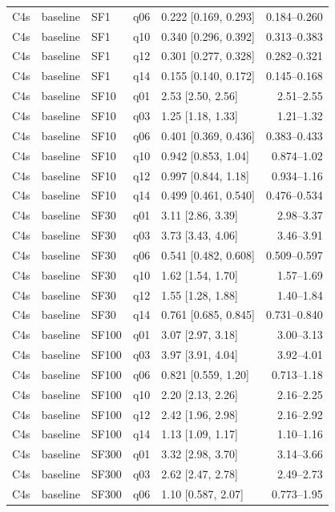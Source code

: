 \begin{longtable}{lllllr}
C4s & baseline & SF1 & q06 & 0.222 [0.169, 0.293] & 0.184--0.260 \\
C4s & baseline & SF1 & q10 & 0.340 [0.296, 0.392] & 0.313--0.383 \\
C4s & baseline & SF1 & q12 & 0.301 [0.277, 0.328] & 0.282--0.321 \\
C4s & baseline & SF1 & q14 & 0.155 [0.140, 0.172] & 0.145--0.168 \\
C4s & baseline & SF10 & q01 & 2.53 [2.50, 2.56] & 2.51--2.55 \\
C4s & baseline & SF10 & q03 & 1.25 [1.18, 1.33] & 1.21--1.32 \\
C4s & baseline & SF10 & q06 & 0.401 [0.369, 0.436] & 0.383--0.433 \\
C4s & baseline & SF10 & q10 & 0.942 [0.853, 1.04] & 0.874--1.02 \\
C4s & baseline & SF10 & q12 & 0.997 [0.844, 1.18] & 0.934--1.16 \\
C4s & baseline & SF10 & q14 & 0.499 [0.461, 0.540] & 0.476--0.534 \\
C4s & baseline & SF30 & q01 & 3.11 [2.86, 3.39] & 2.98--3.37 \\
C4s & baseline & SF30 & q03 & 3.73 [3.43, 4.06] & 3.46--3.91 \\
C4s & baseline & SF30 & q06 & 0.541 [0.482, 0.608] & 0.509--0.597 \\
C4s & baseline & SF30 & q10 & 1.62 [1.54, 1.70] & 1.57--1.69 \\
C4s & baseline & SF30 & q12 & 1.55 [1.28, 1.88] & 1.40--1.84 \\
C4s & baseline & SF30 & q14 & 0.761 [0.685, 0.845] & 0.731--0.840 \\
C4s & baseline & SF100 & q01 & 3.07 [2.97, 3.18] & 3.00--3.13 \\
C4s & baseline & SF100 & q03 & 3.97 [3.91, 4.04] & 3.92--4.01 \\
C4s & baseline & SF100 & q06 & 0.821 [0.559, 1.20] & 0.713--1.18 \\
C4s & baseline & SF100 & q10 & 2.20 [2.13, 2.26] & 2.16--2.25 \\
C4s & baseline & SF100 & q12 & 2.42 [1.96, 2.98] & 2.16--2.92 \\
C4s & baseline & SF100 & q14 & 1.13 [1.09, 1.17] & 1.10--1.16 \\
C4s & baseline & SF300 & q01 & 3.32 [2.98, 3.70] & 3.14--3.66 \\
C4s & baseline & SF300 & q03 & 2.62 [2.47, 2.78] & 2.49--2.73 \\
C4s & baseline & SF300 & q06 & 1.10 [0.587, 2.07] & 0.773--1.95 \\

\end{longtable}

